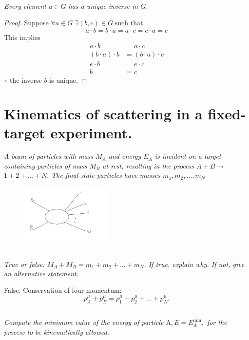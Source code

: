 \documentclass{article}
\begin{document}
\subsection{}
\textit{Every element $a \in G$ has a unique inverse in $G$.}

\begin{proof}
Suppose $\forall a \in G \; \exists (b,c) \in G \; \text {such that} $
$$
a \cdot b=b \cdot a=a \cdot c=c \cdot a=e
$$
This implies 
\begin{align*}
a \cdot b &= a \cdot c \\
(b \cdot a) \cdot b &= (b\cdot a) \cdot c \\
e \cdot b &= e \cdot c \\
b &= c
\end{align*}
$\therefore$ the inverse $b$ is unique.
\end{proof}

\newpage


\section{Kinematics of scattering in a fixed-target experiment.}
\textit{A beam of particles with mass $M_{A}$ and energy $E_{A}$ is incident on a target containing particles of mass $M_{B}$ at rest, resulting in the process $A+B \rightarrow$ $1+2+\ldots+N .$ The final-state particles have masses $m_{1}, m_{2}, \ldots, m_{N}$}

\begin{figure}[h!]
    \centering
    \includegraphics[width=0.4\textwidth]{figures/problem_5.png}
    \label{fig:my_label}
\end{figure}
\subsection{}
\textit{True or false: $M_{A}+M_{B}=m_{1}+m_{2}+\ldots+m_{N} .$ If true, explain why. If not, give an alternative statement.}


False. Conservation of four-momentum:  
$$
p^\mu_{A}+p^\mu_{B}=p^\mu_{1}+p^\mu_{2}+\ldots+p^\mu_{N}.
$$
\subsection{}
\textit{Compute the minimum value of the energy of particle $\mathrm{A}, E=E_{A}^{\min },$ for the process to be kinematically allowed.}
\end{document}
